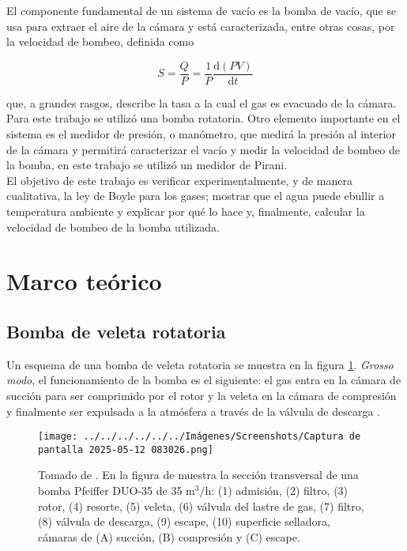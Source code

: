 \documentclass[final,5p,times,twocolumn, nopreprintline]{elsarticle}
\numberwithin{equation}{section}
\begin{document}
El componente fundamental de un sistema de vacío es la bomba de vacío, que se usa para extraer el aire de la cámara y está caracterizada, entre otras cosas, por la velocidad de bombeo, definida como \cite{van1965vacuum}

\begin{equation}
S=\dfrac{Q}{P}=\dfrac{1}{P}\dfrac{\mathrm{d}(PV)}{\mathrm{d}t} \label{eq1}
\end{equation}

que, a grandes rasgos, describe la tasa a la cual el gas es evacuado de la cámara. Para este trabajo se utilizó una bomba rotatoria. Otro elemento importante en el sistema es el medidor de presión, o manómetro, que medirá la presión al interior de la cámara y permitirá caracterizar el vacío y medir la velocidad de bombeo de la bomba, en este trabajo se utilizó un medidor de Pirani.\\

El objetivo de este trabajo es verificar experimentalmente, y de manera cualitativa, la ley de Boyle para los gases; mostrar que el agua puede ebullir a temperatura ambiente y explicar por qué lo hace y, finalmente, calcular la velocidad de bombeo de la bomba utilizada.

\section{Marco teórico} 

\subsection{Bomba de veleta rotatoria}
Un esquema de una bomba de veleta rotatoria se muestra en la figura \ref{fig1}. \emph{Grosso modo}, el funcionamiento de la bomba es el siguiente: el gas entra en la cámara de succión para ser comprimido por el rotor y la veleta en la cámara de compresión y finalmente ser expulsada a la atmósfera a través de la válvula de descarga \cite{o2023users}.


\begin{figure}[h!]
\begin{center}
\texttt{[image: ../../../../../../Imágenes/Screenshots/Captura de pantalla 2025-05-12 083026.png]} 
\caption{Tomado de \cite{o2023users}. En la figura de muestra la sección transversal de una bomba Pfeiffer DUO-35 de 35 $\text{m}^3/\text{h}$: (1) admisión, (2) filtro, (3) rotor, (4) resorte, (5) veleta, (6) válvula del lastre de gas, (7) filtro, (8) válvula de descarga, (9) escape, (10) superficie selladora, cámaras de (A) succión, (B) compresión y (C) escape.} \label{fig1}
\end{center}
\end{figure}
\end{document}
